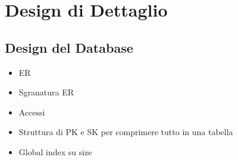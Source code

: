 \chapter{Design di Dettaglio}


\section{Design del Database}

\begin{itemize}
    \item ER
    \item Sgranatura ER
    \item Accessi
    \item Struttura di PK e SK per comprimere tutto in una tabella 
    \item Global index su size

\end{itemize}

